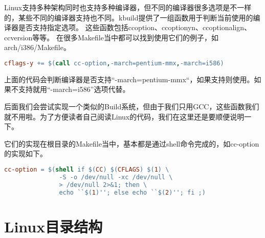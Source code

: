 Linux支持多种架构同时也支持多种编译器，但不同的编译器很多选项是不一样的，某些不同的编译器支持也不同。kbuild提供了一组函数用于判断当前使用的编译器是否支持指定选项。
这些函数包括cc\-option、cc\-option\-yn、cc\-option\-align、cc\-version等等。
在很多Makefile当中都可以找到使用它们的例子，如arch/i386/Makefile。
\begin{lstlisting}[language=make]
cflags-y += $(call cc-option,-march=pentium-mmx,-march=i586)
\end{lstlisting}
上面的代码会判断编译器是否支持“-march=pentium-mmx“，如果支持则使用。如果不支持就用“-march=i586”选项代替。

后面我们会尝试实现一个类似的Build系统，但由于我们只用GCC，这些函数我们就不用啦。为了方便读者自己阅读Linux的代码，我们在这里还是要顺便说明一下。


它们的实现在根目录的Makefile当中，基本都是通过shell命令完成的，如cc-option的实现如下。
\begin{lstlisting}[language=make]
cc-option = $(shell if $(CC) $(CFLAGS) $(1) \
               -S -o /dev/null -xc /dev/null \
               > /dev/null 2>&1; then \
               echo ``$(1)''; else echo ``$(2)''; fi ;)

\end{lstlisting}

\section{Linux目录结构}
